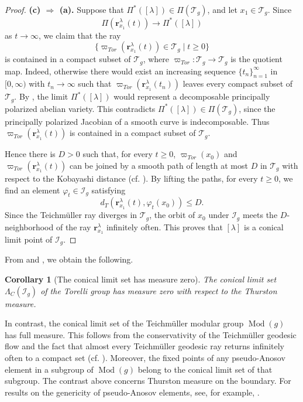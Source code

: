 \documentclass[dvipdfmx]{amsart}
\newtheorem{corollary}{Corollary}[section]
\theoremstyle{remark}
\newcommand{\teich}{\mathcal{T}}
\newcommand{\torelli}{\mathscr{T}}
\newcommand{\tmod}{\operatorname{Mod}}
\newcommand{\torelliG}{\mathcal{I}}
\newcommand{\ray}{{\boldsymbol r}}
\newcommand{\prG}{\operatorname{\varpi}}
\begin{document}
\begin{proof}
\medskip
\noindent
{\bf (c) $\Rightarrow$ (a).}
Suppose that $\Pi^*([\lambda])\in \Pi(\teich_g)$, and let $x_1\in \teich_{g}$.
Since
\[
\Pi(\ray^{\lambda}_{x_1}(t))\to \Pi^*([\lambda])
\]
as $t\to \infty$, we claim that the ray
\[
\{\prG_{Tor}(\ray^{\lambda}_{x_1}(t))\in \torelli_g \mid t\ge 0\}
\]
is contained in a compact subset of $\torelli_g$, where $\prG_{Tor}\colon \teich_{g}\to \torelli_{g}$ is the quotient map.
Indeed, otherwise there would exist an increasing sequence $\{t_n\}_{n=1}^{\infty}$ in $[0,\infty)$ with $t_n\to\infty$ such that $\prG_{Tor}(\ray^{\lambda}_{x_1}(t_n))$ leaves every compact subset of $\torelli_g$.
By , the limit
$\Pi^*([\lambda])$ would represent a decomposable
principally polarized abelian variety.
This contradicts
$\Pi^*([\lambda])\in\Pi(\teich_g)$, since the
principally polarized Jacobian of a smooth curve
is indecomposable.
Thus $\prG_{Tor}(\ray^{\lambda}_{x_1}(t))$ is contained in a compact subset of $\torelli_g$.

Hence there is $D>0$ such that, for every $t\ge 0$, $\prG_{Tor}(x_0)$ and $\prG_{Tor}(\ray^{\lambda}_{x_1}(t))$ can be joined by a smooth path of length at most $D$ in $\torelli_g$ with respect to the Kobayashi distance (cf. \cite{Royden1971b}).
By lifting the paths, for every $t\geq 0$, we find an element $\varphi_t\in \torelliG_{g}$ satisfying
\[
d_T(\ray^{\lambda}_{x_1}(t),\varphi_t(x_0))\le D.
\]
Since the Teichm\"uller ray diverges in $\teich_g$, the orbit of $x_0$ under $\torelliG_g$ meets the $D$-neighborhood of the ray $\ray^{\lambda}_{x_1}$ infinitely often.
This proves that $[\lambda]$ is a conical limit point of $\torelliG_{g}$.
\end{proof}


From  and , we obtain the following.

\begin{corollary}[The conical limit set has measure zero]
\label{cor:conical_limit_sets}
The conical limit set $\Lambda_C(\torelliG_{g})$ of the Torelli group has measure zero with respect to the Thurston measure.
\end{corollary}

In contrast, the conical limit set of the Teichm\"uller modular group $\tmod(g)$ has full measure. This follows from the conservativity of the Teichm\"uller geodesic flow and the fact that almost every Teichm\"uller geodesic ray returns infinitely often to a compact set (cf. \cite{Masur1982}).
Moreover, the fixed points of any pseudo-Anosov element in a subgroup of $\tmod(g)$ belong to the conical limit set of that subgroup.
The contrast above concerns Thurston measure on the boundary. For results on the genericity of pseudo-Anosov elements, see, for example, \cite{ChoiInhyeok2024, VivekaSoutoJing2020, Maher2011, MalesteinSouto2013, Rivin2008, Rivin2009}.
\end{document}

